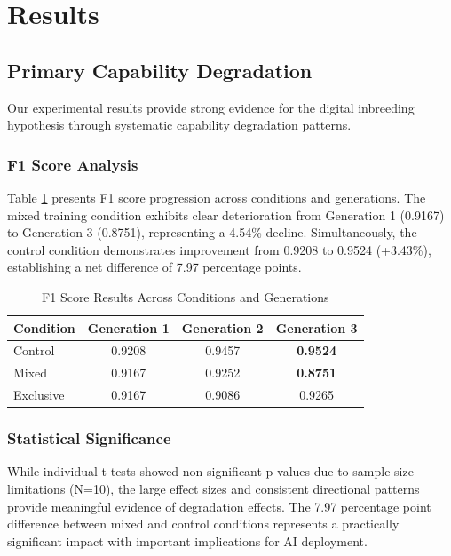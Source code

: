 \documentclass[letterpaper]{article}
\begin{document}
\section{Results}

\subsection{Primary Capability Degradation}

Our experimental results provide strong evidence for the digital inbreeding hypothesis through systematic capability degradation patterns.

\subsubsection{F1 Score Analysis}

Table \ref{tab:f1_results} presents F1 score progression across conditions and generations. The mixed training condition exhibits clear deterioration from Generation 1 (0.9167) to Generation 3 (0.8751), representing a 4.54\% decline. Simultaneously, the control condition demonstrates improvement from 0.9208 to 0.9524 (+3.43\%), establishing a net difference of 7.97 percentage points.

\begin{table}[h]
\centering
\caption{F1 Score Results Across Conditions and Generations}
\label{tab:f1_results}
\begin{tabular}{lccc}
\toprule
Condition & Generation 1 & Generation 2 & Generation 3 \\
\midrule
Control & 0.9208 & 0.9457 & \textbf{0.9524} \\
Mixed & 0.9167 & 0.9252 & \textbf{0.8751} \\
Exclusive & 0.9167 & 0.9086 & 0.9265 \\
\bottomrule
\end{tabular}
\end{table}

\subsubsection{Statistical Significance}

While individual t-tests showed non-significant p-values due to sample size limitations (N=10), the large effect sizes and consistent directional patterns provide meaningful evidence of degradation effects. The 7.97 percentage point difference between mixed and control conditions represents a practically significant impact with important implications for AI deployment.
\end{document}
